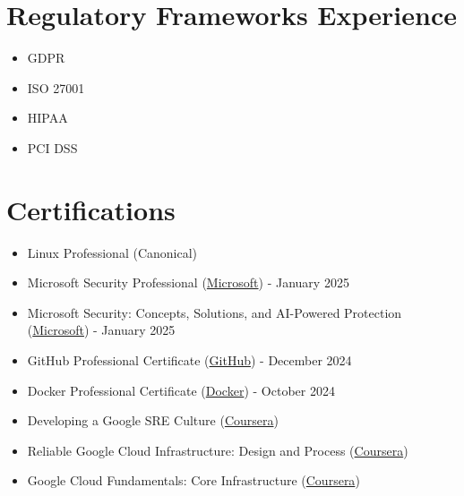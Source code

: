 \documentclass[11pt,a4paper]{article}
\begin{document}
\section*{Regulatory Frameworks Experience}
\label{sec:org9ed1337}
\begin{itemize}
\item GDPR
\item ISO 27001
\item HIPAA
\item PCI DSS
\end{itemize}
\section*{Certifications}
\label{sec:orgc687116}
\begin{itemize}
\item Linux Professional (Canonical)
\item Microsoft Security Professional (\href{https://www.linkedin.com/learning/certificates/ee3a4639802b3dc095cb238c027ee834d835bdc7805a53a60d018d2e00e9a7ba}{Microsoft}) - January 2025
\item Microsoft Security: Concepts, Solutions, and AI-Powered Protection (\href{https://www.linkedin.com/learning/certificates/dc3038c0ad5e24a3655ef339a84ae0dff9675d9dfea26fc86aca1b5616c61041}{Microsoft}) - January 2025
\item GitHub Professional Certificate (\href{https://www.linkedin.com/learning/certificates/3cec3708ecd52cd57a95ee0992a3280ae39829a47fd3ba671d2cc4a5533b26fe}{GitHub}) - December 2024
\item Docker Professional Certificate (\href{https://www.linkedin.com/learning/certificates/e47cf4f9073b8edd949ece7fa926291895bdaffb07e9aabef0f1b195f4c5f938}{Docker}) - October 2024
\item Developing a Google SRE Culture (\href{https://s3.amazonaws.com/coursera\_assets/meta\_images/generated/CERTIFICATE\_LANDING\_PAGE/CERTIFICATE\_LANDING\_PAGE\~KZ9U9HKHX7LJ/CERTIFICATE\_LANDING\_PAGE\~KZ9U9HKHX7LJ.jpeg}{Coursera})
\item Reliable Google Cloud Infrastructure: Design and Process (\href{https://s3.amazonaws.com/coursera\_assets/meta\_images/generated/CERTIFICATE\_LANDING\_PAGE/CERTIFICATE\_LANDING\_PAGE\~6GNGQA7DK4QN/CERTIFICATE\_LANDING\_PAGE\~6GNGQA7DK4QN.jpeg}{Coursera})
\item Google Cloud Fundamentals: Core Infrastructure (\href{https://s3.amazonaws.com/coursera\_assets/meta\_images/generated/CERTIFICATE\_LANDING\_PAGE/CERTIFICATE\_LANDING\_PAGE\~6GNGQA7DK4QN/CERTIFICATE\_LANDING\_PAGE\~6GNGQA7DK4QN.jpeg}{Coursera})

\end{itemize}
\end{document}
